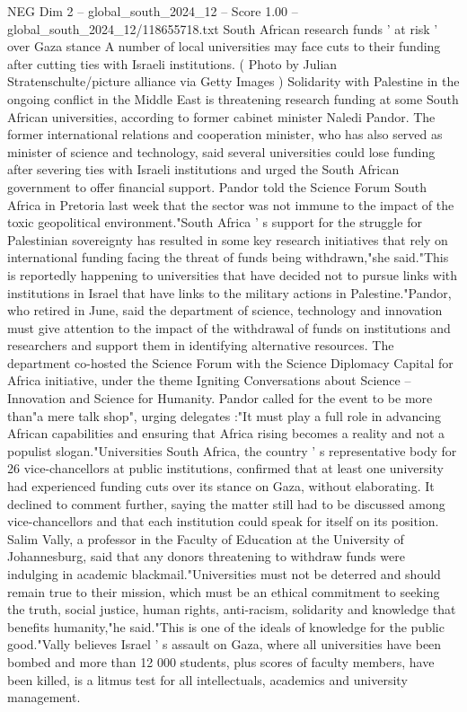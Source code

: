 \begin{textsample}{NEG Dim 2 – global\_south\_2024\_12 – Score 1.00 – global\_south\_2024\_12/118655718.txt}  \label{ex:f2_neg_383}
South African research funds ' at risk ' over Gaza stance A number of local universities may face cuts to their funding after cutting ties with Israeli institutions. ( Photo by Julian Stratenschulte/picture alliance via Getty Images ) Solidarity with Palestine in the ongoing conflict in the Middle East is threatening research funding at some South African universities, according to former cabinet minister Naledi Pandor.
The former international relations and cooperation minister, who has also served as minister of science and technology, said several universities could lose funding after severing ties with Israeli institutions and urged the South African government to offer financial support.
Pandor told the Science Forum South Africa in Pretoria last week that the sector was not immune to the impact of the toxic geopolitical environment."South Africa ' s support for the struggle for Palestinian sovereignty has resulted in some key research initiatives that rely on international funding facing the threat of funds being withdrawn,"she said."This is reportedly happening to universities that have decided not to pursue links with institutions in Israel that have links to the military actions in Palestine."Pandor, who retired in June, said the department of science, technology and innovation must give attention to the impact of the withdrawal of funds on institutions and researchers and support them in identifying alternative resources.
The department co-hosted the Science Forum with the Science Diplomacy Capital for Africa initiative, under the theme Igniting Conversations about Science -- Innovation and Science for Humanity.
Pandor called for the event to be more than"a mere talk shop", urging delegates :"It must play a full role in advancing African capabilities and ensuring that Africa rising becomes a reality and not a populist slogan."Universities South Africa, the country ' s representative body for 26 vice-chancellors at public institutions, confirmed that at least one university had experienced funding cuts over its stance on Gaza, without elaborating.
It declined to comment further, saying the matter still had to be discussed among vice-chancellors and that each institution could speak for itself on its position.
Salim Vally, a professor in the Faculty of Education at the University of Johannesburg, said that any donors threatening to withdraw funds were indulging in academic blackmail."Universities must not be deterred and should remain true to their mission, which must be an ethical commitment to seeking the truth, social justice, human rights, anti-racism, solidarity and knowledge that benefits humanity,"he said."This is one of the ideals of knowledge for the public good."Vally believes Israel ' s assault on Gaza, where all universities have been bombed and more than 12 000 students, plus scores of faculty members, have been killed, is a litmus test for all intellectuals, academics and university management.

\end{textsample}
